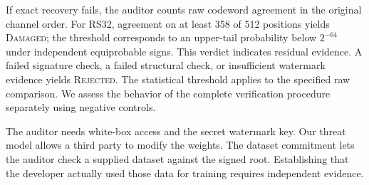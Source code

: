 If exact recovery fails, the auditor counts raw codeword agreement in the original channel order. For RS32, agreement on at least 358 of 512 positions yields \textsc{Damaged}; the threshold corresponds to an upper-tail probability below $2^{-64}$ under independent equiprobable signs. This verdict indicates residual evidence. A failed signature check, a failed structural check, or insufficient watermark evidence yields \textsc{Rejected}. The statistical threshold applies to the specified raw comparison. We assess the behavior of the complete verification procedure separately using negative controls.

The auditor needs white-box access and the secret watermark key. Our threat model allows a third party to modify the weights. The dataset commitment lets the auditor check a supplied dataset against the signed root. Establishing that the developer actually used those data for training requires independent evidence.
